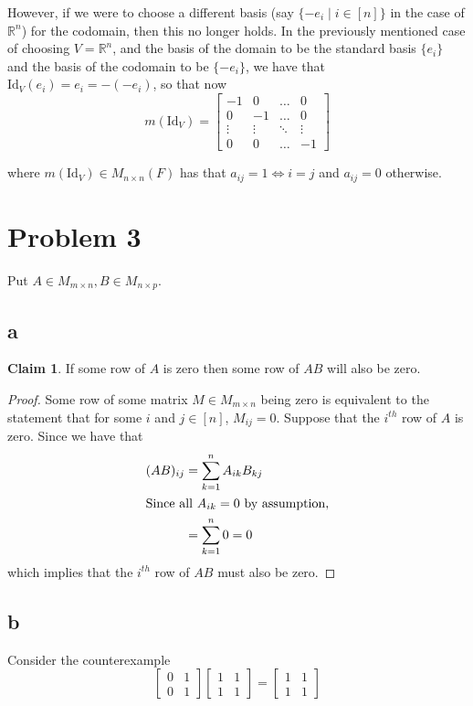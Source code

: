 \documentclass[12pt,letterpaper]{article}
\theoremstyle{definition}
\newtheorem*{claim}{Claim}
\newcommand{\R}{\mathbb{R}}
\newcommand{\id}{\mathrm{Id}}
\begin{document}
However, if we were to choose a different basis (say $\{-e_i \mid i \in [n]\}$
in the case of $\R^n$) for the codomain, then this no longer holds. In the
previously mentioned case of choosing $V = \R^n$, and the basis of the domain to
be the standard basis $\{e_i\}$ and the basis of the codomain to be $\{-e_i\}$,
we have that $\id_V(e_i) = e_i = -(-e_i)$, so that now
\[
  m(\id_V) = \begin{bmatrix}
    -1 & 0 & \dots & 0 \\
    0 & -1 & \dots & 0 \\
    \vdots & \vdots & \ddots & \vdots \\
    0 & 0 & \dots & -1
  \end{bmatrix}
\]

where $m(\id_V) \in M_{n\times n}(F)$ has that $a_{ij} = 1 \iff i = j$ and
$a_{ij} = 0$ otherwise.

\section*{Problem 3}

Put $A \in M_{m \times n}, B \in M_{n \times p}$.

\subsection*{a}

\begin{claim}
  If some row of $A$ is zero then some row of $AB$ will also be zero.
\end{claim}

\begin{proof}
  Some row of some matrix $M \in M_{m \times n}$ being zero is equivalent to the statement that for some $i$
  and $j \in [n]$, $M_{ij} = 0$. Suppose that the $i^{th}$ row of $A$ is zero.
  Since we have that
  \begin{align*}
    (AB)_{ij} &= \sum_{k=1}^nA_{ik}B_{kj} \\
    \intertext{Since all $A_{ik} = 0$ by assumption,}
              &= \sum_{k=1}^n0 = 0
  \end{align*}
  which implies that the $i^{th}$ row of $AB$ must also be zero.
\end{proof}

\subsection*{b}

Consider the counterexample
\[
  \begin{bmatrix}
    0 & 1 \\
    0 & 1
  \end{bmatrix}
  \begin{bmatrix}
    1 & 1 \\
    1 & 1
  \end{bmatrix}
  =
  \begin{bmatrix}
    1 & 1 \\
    1 & 1
  \end{bmatrix}
\]
\end{document}
